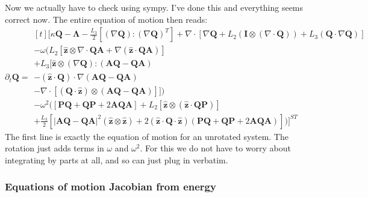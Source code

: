 \documentclass[reqno]{article}
\newcommand{\Q}{\mathbf{Q}}
\newcommand{\bP}{\mathbf{P}}
\newcommand{\A}{\mathbf{A}}
\newcommand{\bLambda}{\boldsymbol{\Lambda}}
\newcommand{\z}{\mathbf{\hat{z}}}
\begin{document}
Now we actually have to check using sympy.
I've done this and everything seems correct now.
The entire equation of motion then reads:
\begin{equation}
    \partial_t \Q
    =
    \begin{multlined}[t]
        \biggl[
            \kappa \Q 
            - \bLambda 
            - \frac{L_3}{2} \left[ 
            \left( \nabla \Q \right) : \left( \nabla \Q \right)^T
            \right]
            + \nabla \cdot \left[
                \nabla \Q
                + L_2 \left(
                \mathbf I \otimes \left( \nabla \cdot \Q \right) 
                \right)
                + L_3 \left( \Q \cdot \nabla \Q \right) 
                \right] \\
            -
            \omega \biggl(
            L_2 \left[ 
            \z \otimes \nabla \cdot \Q \A
            + \nabla \left( \z \cdot \Q \A \right)
            \right] \\
            +
            L_3 \bigl[
                \z \otimes \left( \nabla \Q \right) : \left( \A \Q - \Q \A \right) \\
                - \left( \z \cdot \Q \right) \cdot \nabla \left( \A \Q - \Q \A \right) \\
                - \nabla \cdot \left[ \left( \Q \cdot \z \right) \otimes \left( \A \Q - \Q \A \right) \right]
                \bigr]
            \biggr) \\
            -
            \omega^2 \biggl(
                \left[ \bP \Q + \Q \bP + 2 \A \Q \A \right]
                +
                L_2 \left[ \z \otimes \left( \z \cdot \Q \bP \right) \right] \\
                +
                \frac{L_3}{2} \left[
                    \left| \A \Q - \Q \A \right|^2 \left( \z \otimes \z \right)
                    + 2 \left( \z \cdot \Q \cdot \z \right) \left( \bP \Q + \Q \bP + 2 \A \Q \A \right)
                    \right]
            \biggr)
            \biggr]^{ST}
    \end{multlined}
\end{equation}
The first line is exactly the equation of motion for an unrotated system.
The rotation just adds terms in $\omega$ and $\omega^2$.
For this we do not have to worry about integrating by parts at all, and so can just plug in verbatim.

\subsubsection{Equations of motion Jacobian from energy}
\end{document}

